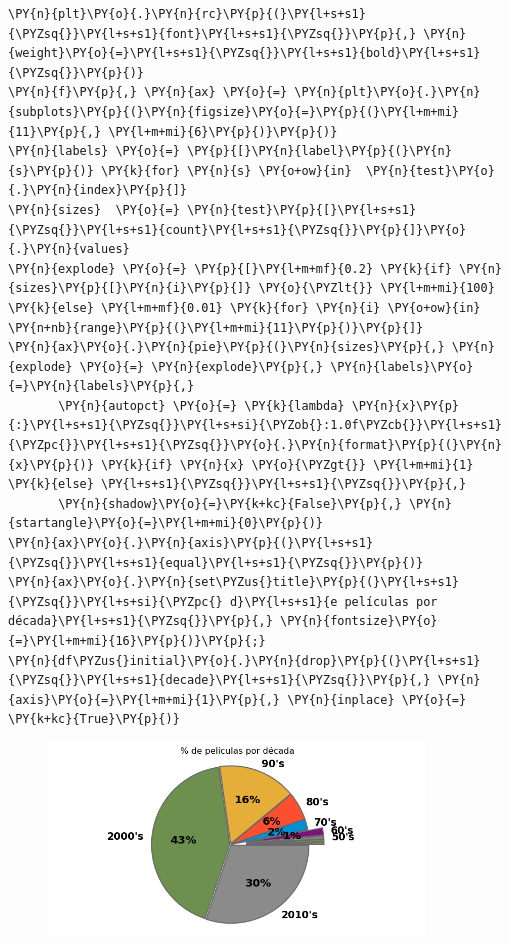 \begin{tcolorbox}[breakable, size=fbox, boxrule=1pt, pad at break*=1mm,colback=cellbackground, colframe=cellborder]
\begin{Verbatim}[commandchars=\\\{\}]
\PY{n}{plt}\PY{o}{.}\PY{n}{rc}\PY{p}{(}\PY{l+s+s1}{\PYZsq{}}\PY{l+s+s1}{font}\PY{l+s+s1}{\PYZsq{}}\PY{p}{,} \PY{n}{weight}\PY{o}{=}\PY{l+s+s1}{\PYZsq{}}\PY{l+s+s1}{bold}\PY{l+s+s1}{\PYZsq{}}\PY{p}{)}
\PY{n}{f}\PY{p}{,} \PY{n}{ax} \PY{o}{=} \PY{n}{plt}\PY{o}{.}\PY{n}{subplots}\PY{p}{(}\PY{n}{figsize}\PY{o}{=}\PY{p}{(}\PY{l+m+mi}{11}\PY{p}{,} \PY{l+m+mi}{6}\PY{p}{)}\PY{p}{)}
\PY{n}{labels} \PY{o}{=} \PY{p}{[}\PY{n}{label}\PY{p}{(}\PY{n}{s}\PY{p}{)} \PY{k}{for} \PY{n}{s} \PY{o+ow}{in}  \PY{n}{test}\PY{o}{.}\PY{n}{index}\PY{p}{]}
\PY{n}{sizes}  \PY{o}{=} \PY{n}{test}\PY{p}{[}\PY{l+s+s1}{\PYZsq{}}\PY{l+s+s1}{count}\PY{l+s+s1}{\PYZsq{}}\PY{p}{]}\PY{o}{.}\PY{n}{values}
\PY{n}{explode} \PY{o}{=} \PY{p}{[}\PY{l+m+mf}{0.2} \PY{k}{if} \PY{n}{sizes}\PY{p}{[}\PY{n}{i}\PY{p}{]} \PY{o}{\PYZlt{}} \PY{l+m+mi}{100} \PY{k}{else} \PY{l+m+mf}{0.01} \PY{k}{for} \PY{n}{i} \PY{o+ow}{in} \PY{n+nb}{range}\PY{p}{(}\PY{l+m+mi}{11}\PY{p}{)}\PY{p}{]}
\PY{n}{ax}\PY{o}{.}\PY{n}{pie}\PY{p}{(}\PY{n}{sizes}\PY{p}{,} \PY{n}{explode} \PY{o}{=} \PY{n}{explode}\PY{p}{,} \PY{n}{labels}\PY{o}{=}\PY{n}{labels}\PY{p}{,}
       \PY{n}{autopct} \PY{o}{=} \PY{k}{lambda} \PY{n}{x}\PY{p}{:}\PY{l+s+s1}{\PYZsq{}}\PY{l+s+si}{\PYZob{}:1.0f\PYZcb{}}\PY{l+s+s1}{\PYZpc{}}\PY{l+s+s1}{\PYZsq{}}\PY{o}{.}\PY{n}{format}\PY{p}{(}\PY{n}{x}\PY{p}{)} \PY{k}{if} \PY{n}{x} \PY{o}{\PYZgt{}} \PY{l+m+mi}{1} \PY{k}{else} \PY{l+s+s1}{\PYZsq{}}\PY{l+s+s1}{\PYZsq{}}\PY{p}{,}
       \PY{n}{shadow}\PY{o}{=}\PY{k+kc}{False}\PY{p}{,} \PY{n}{startangle}\PY{o}{=}\PY{l+m+mi}{0}\PY{p}{)}
\PY{n}{ax}\PY{o}{.}\PY{n}{axis}\PY{p}{(}\PY{l+s+s1}{\PYZsq{}}\PY{l+s+s1}{equal}\PY{l+s+s1}{\PYZsq{}}\PY{p}{)}
\PY{n}{ax}\PY{o}{.}\PY{n}{set\PYZus{}title}\PY{p}{(}\PY{l+s+s1}{\PYZsq{}}\PY{l+s+si}{\PYZpc{} d}\PY{l+s+s1}{e películas por década}\PY{l+s+s1}{\PYZsq{}}\PY{p}{,} \PY{n}{fontsize}\PY{o}{=}\PY{l+m+mi}{16}\PY{p}{)}\PY{p}{;}
\PY{n}{df\PYZus{}initial}\PY{o}{.}\PY{n}{drop}\PY{p}{(}\PY{l+s+s1}{\PYZsq{}}\PY{l+s+s1}{decade}\PY{l+s+s1}{\PYZsq{}}\PY{p}{,} \PY{n}{axis}\PY{o}{=}\PY{l+m+mi}{1}\PY{p}{,} \PY{n}{inplace} \PY{o}{=} \PY{k+kc}{True}\PY{p}{)}
\end{Verbatim}
\end{tcolorbox}

\begin{figure}[h]
    \centering
    \captionsetup{width=10cm}
    \includegraphics[width=10cm]{./contenido/imagenes/output_25_0.png}

\end{figure}

